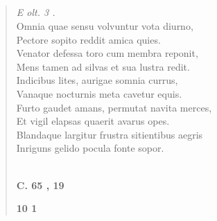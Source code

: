 \documentclass[11pt, a4paper]{report}
\begin{document}
            \subsection*{}
      \begin{verse}
      \textit{E olt. 3 .} \\ Omnia quae sensu volvuntur vota diurno, \\ Pectore sopito reddit amica quies. \\ Venator defessa toro cum membra reponit, \\ Mens tamen ad silvas et sua lustra redit. \\ Indicibus lites, aurigae somnia currus, \\ Vanaque nocturnis meta cavetur equis. \\ Furto gaudet amans, permutat navita merces, \\ Et vigil elapsas quaerit avarus opes. \\ Blandaque largitur frustra sitientibus aegris \\ Inriguns gelido pocula fonte sopor. \\ 
        ﻿\pagebreak 
    \begin{center} \textbf{C. 65 , 19} \end{center}\begin{center} \textbf{10 1} \end{center}
      \end{verse}
  
\end{document}
